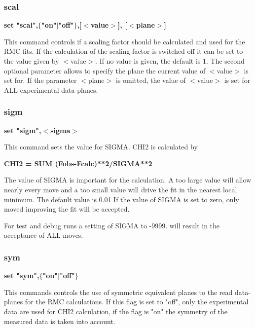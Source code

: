 \subsubsection{scal}
{\bf set "scal",$ \{$"on"$| $"off"$\} $,[$ <$value$> $], [$ <$plane$> $] \par }
\par
\vspace{3pt}
This command controls if a scaling factor should be calculated and 
used for the RMC fits. If the calculation of the scaling factor is 
switched off it can be set to the value given by $ <$value$> $. If no value 
is given, the default is 1. The second optional parameter allows to 
specify the plane the current value of $ <$value$> $ is set for. If the 
parameter $ <$plane$> $ is omitted, the value of $ <$value$> $ is set for ALL 
experimental data planes. 
\subsubsection{sigm}
{\bf set "sigm",$ <$sigma$> $ \par }
\par
\vspace{3pt}
This command sets the value for SIGMA. CHI2 is calculated by 
\par
{\bf    CHI2 = SUM (Fobs-Fcalc)**2/SIGMA**2 \par }
\par
\vspace{3pt}
The value of SIGMA is important for the calculation. A too large 
value will allow nearly every move and a too small value will 
drive the fit in the nearest local minimum. The default value is 0.01 
If the value of SIGMA is set to zero, only moved improving the fit 
will be accepted. 
\par
For test and debug runs a setting of SIGMA to -9999. will result 
in the acceptance of ALL moves. 
\subsubsection{sym}
{\bf set "sym",$ \{$"on"$| $"off"$\} $ \par }
\par
\vspace{3pt}
This commands controls the use of symmetric equivalent planes to the 
read data-planes for the RMC calculations. If this flag is set to "off", 
only the experimental data are used for CHI2 calculation, if the flag 
is "on" the symmetry of the measured data is taken into account. 
